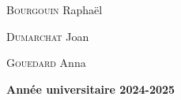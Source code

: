 \begin{titlepage}
\begin{center}
\vfill

\noindent\begin{minipage}{0.30\textwidth}
 \begin{flushleft} \large
    \textsc{Bourgouin} Raphaël\\
  \end{flushleft}
\end{minipage}
\hspace{0.02\textwidth}  
\begin{minipage}{0.30\textwidth}
\begin{center} \large
    \textsc{Dumarchat} Joan\\
  \end{center}
\end{minipage}
\hspace{0.02\textwidth}  
\begin{minipage}{0.30\textwidth}
\begin{flushright} \large
    \textsc{Gouedard} Anna\\
  \end{flushright}
\end{minipage}

\vspace{1cm}

{\textbf{\large {Année universitaire} 2024-2025}}

\end{center}
\end{titlepage}
